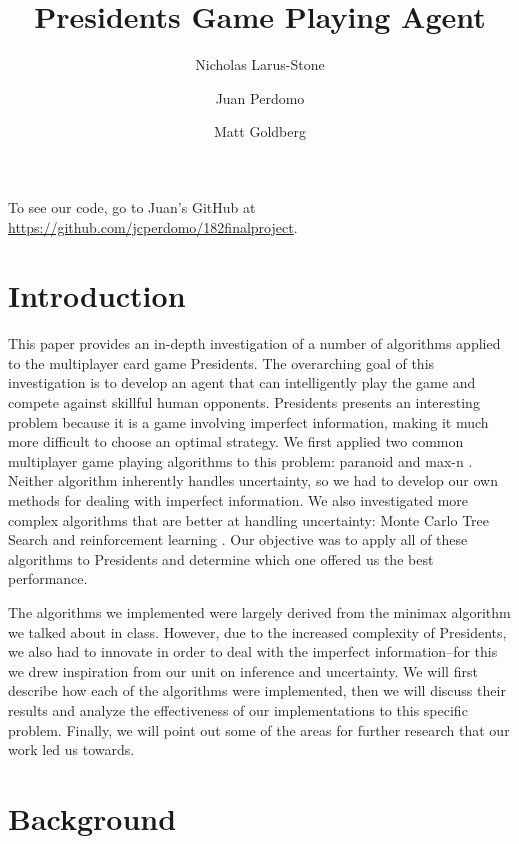 \documentclass[11pt]{article}
\title{Presidents Game Playing Agent}
\author{Nicholas Larus-Stone \and Juan Perdomo \and Matt Goldberg}
\begin{document}
\maketitle{}

To see our code, go to Juan's GitHub at \url{https://github.com/jcperdomo/182finalproject}.

\section{Introduction}

This paper provides an in-depth investigation of a number of algorithms applied to the multiplayer card game Presidents. The overarching goal of this investigation is to develop an agent that can intelligently play the game and compete against skillful human opponents.   Presidents presents an interesting problem because it is a game involving imperfect information, making it much more difficult to choose an optimal strategy. We first applied two common multiplayer game playing algorithms to this problem: paranoid and max-n \cite{sturtevant03a}. Neither algorithm inherently handles uncertainty, so we had to develop our own methods for dealing with imperfect information. We also investigated more complex algorithms that are better at handling uncertainty: Monte Carlo Tree Search \cite{browne12} and reinforcement learning \cite{fujita03}. Our objective was to apply all of these algorithms to Presidents and determine which one offered us the best performance.

The algorithms we implemented were largely derived from the minimax algorithm we talked about in class. However, due to the increased complexity of Presidents, we also had to innovate in order to deal with the imperfect information--for this we drew inspiration from our unit on inference and uncertainty. We will first describe how each of the algorithms were implemented, then we will discuss their results and analyze the effectiveness of our implementations to this specific problem. Finally, we will point out some of the areas for further research that our work led us towards.

\section{Background}
\end{document}
